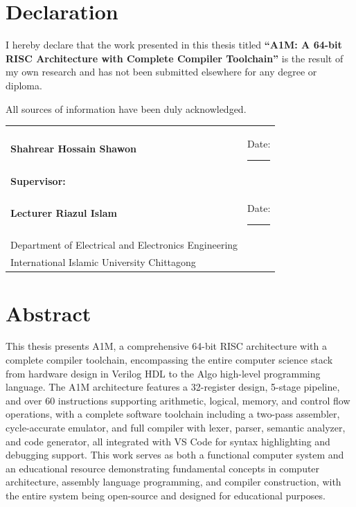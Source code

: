 \documentclass[12pt,a4paper,oneside]{book}
\begin{document}
\chapter*{Declaration}

I hereby declare that the work presented in this thesis titled \textbf{``A1M: A 64-bit RISC Architecture with Complete Compiler Toolchain''} is the result of my own research and has not been submitted elsewhere for any degree or diploma.

All sources of information have been duly acknowledged.

\vspace{2cm}

\noindent
\begin{tabular}{@{}ll}
\textbf{Shahrear Hossain Shawon} & Date: \rule{3cm}{0.4pt} \\[2cm]
\textbf{Supervisor:} & \\
\textbf{Lecturer Riazul Islam} & Date: \rule{3cm}{0.4pt} \\
Department of Electrical and Electronics Engineering & \\
International Islamic University Chittagong & \\
\end{tabular}

\chapter*{Abstract}

This thesis presents A1M, a comprehensive 64-bit RISC architecture with a complete compiler toolchain, encompassing the entire computer science stack from hardware design in Verilog HDL to the Algo high-level programming language. The A1M architecture features a 32-register design, 5-stage pipeline, and over 60 instructions supporting arithmetic, logical, memory, and control flow operations, with a complete software toolchain including a two-pass assembler, cycle-accurate emulator, and full compiler with lexer, parser, semantic analyzer, and code generator, all integrated with VS Code for syntax highlighting and debugging support. This work serves as both a functional computer system and an educational resource demonstrating fundamental concepts in computer architecture, assembly language programming, and compiler construction, with the entire system being open-source and designed for educational purposes.
\end{document}
